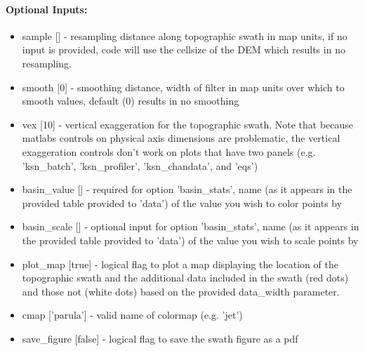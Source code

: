 \paragraph{Optional Inputs:}
\begin{itemize}
\item sample [] - resampling distance along topographic swath in map units, if no input is provided, code will use the cellsize 
of the DEM which results in no resampling.
\item smooth [0] - smoothing distance, width of filter in map units over which to smooth values, default (0) results in no smoothing
\item vex [10] - vertical exaggeration for the topographic swath. Note that because matlabs controls on physical axis dimensions are
problematic, the vertical exaggeration controls don't work on plots that have two panels (e.g. 'ksn\_batch', 'ksn\_profiler',
'ksn\_chandata', and 'eqs')
\item basin\_value [] - required for option 'basin\_stats', name (as it appears in the provided table provided to 'data') of the value 
you wish to color points by
\item basin\_scale [] - optional input for option 'basin\_stats', name (as it appears in the provided table provided to 'data') of the 
value you wish to scale points by
\item plot\_map [true] - logical flag to plot a map displaying the location of the topographic swath and the additional data included 
in the swath (red dots) and those not (white dots) based on the provided data\_width parameter.
\item cmap ['parula'] - valid name of colormap (e.g. 'jet') 
\item save\_figure [false] - logical flag to save the swath figure as a pdf
\end{itemize}

